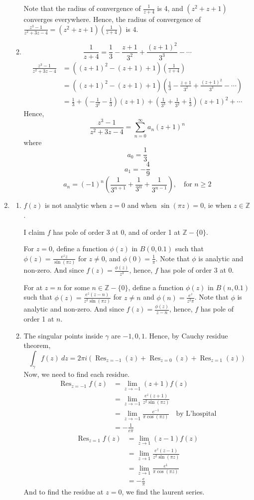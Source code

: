 \documentclass{article}
\newcommand{\paren}[1]{\left(#1\right)}
\newcommand{\Z}{\mathbb{Z}}
\DeclareMathOperator{\Res}{Res}
\begin{document}
\begin{enumerate}
\begin{enumerate}
Note that the radius of convergence of $\frac{1}{z+4}$ is 4, and $(z^2 + z + 1)$ converges everywhere. Hence, the radius of convergence of $\frac{z^3-1}{z^2+3z-4} = (z^2 + z + 1)\paren{\frac{1}{z+4}}$ is 4.
\item
\[
\frac{1}{z+4} = \frac{1}{3} - \frac{z+1}{3^2} + \frac{(z+1)^2}{3^3} - \cdots
\]
\begin{align*}
\frac{z^3-1}{z^2+3z-4} &= ((z+1)^2 - (z+1) + 1)\paren{\frac{1}{z+4}} \\
    &= ((z+1)^2 - (z+1) + 1)\paren{\frac{1}{3} - \frac{z+1}{3^2} + \frac{(z+1)^2}{3^3} - \cdots} \\
    &= \frac{1}{3} + \paren{-\frac{1}{3^2} - \frac{1}{3}}(z+1) + \paren{\frac{1}{3^3} + \frac{1}{3^2} + \frac{1}{3}}(z+1)^2 + \cdots
\end{align*}
Hence,
\[
\frac{z^3-1}{z^2+3z-4} = \sum_{n=0}^\infty a_n (z+1)^n
\]
where
\[a_0 = \frac{1}{3}\]
\[a_1 = -\frac{4}{9}\]
\[
a_n = (-1)^n\paren{\frac{1}{3^{n+1}} + \frac{1}{3^{n}} + \frac{1}{3^{n-1}}}, \quad \text{for }n\geq 2
\]
\end{enumerate}
\item
\begin{enumerate}
\item $f(z)$ is not analytic when $z=0$ and when $\sin(\pi z)=0$, ie when $z \in \Z$.

I claim $f$ has pole of order 3 at 0, and of order 1 at $\Z - \{0\}$.

For $z=0$, define a function $\phi(z)$ in $B(0,0.1)$ such that $\phi(z) = \frac{e^z z}{\sin(\pi z)}$ for $z \neq 0$, and $\phi(0) = \frac{1}{\pi}$. Note that $\phi$ is analytic and non-zero. And since $f(z) = \frac{\phi(z)}{z^3}$, hence, $f$ has pole of order 3 at 0.

For at $z=n$ for some $n \in \Z - \{0\}$, define a function $\phi(z)$ in $B(n,0.1)$ such that $\phi(z) = \frac{e^z (z-n)}{z^2 \sin(\pi z)}$ for $z \neq n$ and $\phi(n) = \frac{e^z}{z^2 \pi}$. Note that $\phi$ is analytic and non-zero. And since $f(z) = \frac{\phi(z)}{z-n}$, hence, $f$ has pole of order 1 at $n$.
\item The singular points inside $\gamma$ are $-1,0,1$. Hence, by Cauchy residue theorem,
\[
\int_\gamma f(z)\ dz = 2\pi i (\Res_{z=-1}(z) + \Res_{z=0}(z) + \Res_{z=1}(z))
\]
Now, we need to find each residue.
\begin{align*}
\Res_{z=-1} f(z) &= \lim_{z \to -1} (z+1)f(z) \\
    &= \lim_{z \to -1} \frac{e^z(z+1)}{z^2 \sin(\pi z)} \\
    &= \lim_{z \to -1} \frac{e^{-1}}{\pi \cos(\pi z)} \quad \text{by L'hospital} \\
    &= -\frac{1}{e\pi}
\end{align*}
\begin{align*}
\Res_{z=1} f(z) &= \lim_{z \to 1} (z-1)f(z) \\
    &= \lim_{z \to 1} \frac{e^z(z-1)}{z^2 \sin(\pi z)} \\
    &= \lim_{z \to 1} \frac{e^{1}}{\pi \cos(\pi z)} \\
    &= -\frac{e}{\pi}
\end{align*}
And to find the residue at $z=0$, we find the laurent series.


\end{enumerate}
\end{enumerate}
\end{document}
